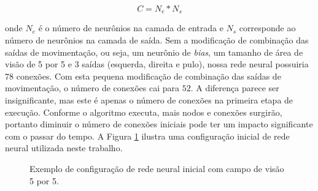 \begin{equation}
	\label{eq:network-connections}
	C = N_e * N_s
\end{equation}

onde $N_e$ é o número de neurônios na camada de entrada e $N_s$ corresponde ao
número de neurônios na camada de saída. Sem a modificação de combinação das
saídas de movimentação, ou seja, um neurônio de \textit{bias}, um tamanho de
área de visão de 5 por 5 e 3 saídas (esquerda, direita e pulo), nossa rede
neural possuiria $78$ conexões.  Com esta pequena modificação de combinação das
saídas de movimentação, o número de conexões cai para $52$. A diferença parece
ser insignificante, mas este é apenas o número de conexões na primeira etapa de
execução. Conforme o algoritmo executa, mais nodos e conexões surgirão, portanto
diminuir o número de conexões iniciais pode ter um impacto significante com o
passar do tempo. A Figura \ref{fig:modelling-network-example} ilustra uma
configuração inicial de rede neural utilizada neste trabalho.

\begin{figure}[H]
\centering
{}
\caption {\label{fig:modelling-network-example}Exemplo de configuração de rede
	neural inicial com campo de visão 5 por 5.}
\end{figure}

